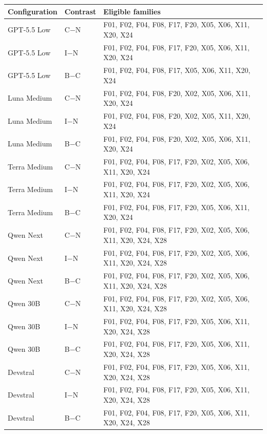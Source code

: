 \begin{tabular}{llp{9cm}}
\toprule
Configuration & Contrast & Eligible families\\
\midrule
GPT-5.5 Low & C$-$N & F01, F02, F04, F08, F17, F20, X05, X06, X11, X20, X24\\
GPT-5.5 Low & I$-$N & F01, F02, F04, F08, F17, F20, X05, X06, X11, X20, X24\\
GPT-5.5 Low & B$-$C & F01, F02, F04, F08, F17, X05, X06, X11, X20, X24\\
Luna Medium & C$-$N & F01, F02, F04, F08, F20, X02, X05, X06, X11, X20, X24\\
Luna Medium & I$-$N & F01, F02, F04, F08, F20, X02, X05, X11, X20, X24\\
Luna Medium & B$-$C & F01, F02, F04, F08, F20, X02, X05, X06, X11, X20, X24\\
Terra Medium & C$-$N & F01, F02, F04, F08, F17, F20, X02, X05, X06, X11, X20, X24\\
Terra Medium & I$-$N & F01, F02, F04, F08, F17, F20, X02, X05, X06, X11, X20, X24\\
Terra Medium & B$-$C & F01, F02, F04, F08, F17, F20, X05, X06, X11, X20, X24\\
Qwen Next & C$-$N & F01, F02, F04, F08, F17, F20, X02, X05, X06, X11, X20, X24, X28\\
Qwen Next & I$-$N & F01, F02, F04, F08, F17, F20, X02, X05, X06, X11, X20, X24, X28\\
Qwen Next & B$-$C & F01, F02, F04, F08, F17, F20, X02, X05, X06, X11, X20, X24, X28\\
Qwen 30B & C$-$N & F01, F02, F04, F08, F17, F20, X02, X05, X06, X11, X20, X24, X28\\
Qwen 30B & I$-$N & F01, F02, F04, F08, F17, F20, X05, X06, X11, X20, X24, X28\\
Qwen 30B & B$-$C & F01, F02, F04, F08, F17, F20, X05, X06, X11, X20, X24, X28\\
Devstral & C$-$N & F01, F02, F04, F08, F17, F20, X05, X06, X11, X20, X24, X28\\
Devstral & I$-$N & F01, F02, F04, F08, F17, F20, X05, X06, X11, X20, X24, X28\\
Devstral & B$-$C & F01, F02, F04, F08, F17, F20, X05, X06, X11, X20, X24, X28\\
\bottomrule
\end{tabular}
